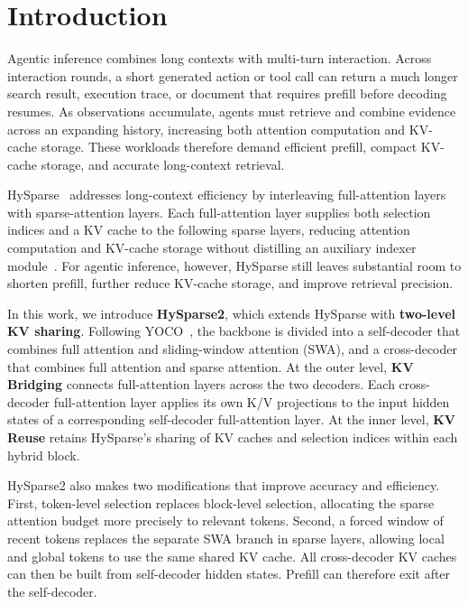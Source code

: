 \section{Introduction}
Agentic inference combines long contexts with multi-turn interaction.
Across interaction rounds, a short generated action or tool call can return a much longer search result, execution trace, or document that requires prefill before decoding resumes.
As observations accumulate, agents must retrieve and combine evidence across an expanding history, increasing both attention computation and KV-cache storage.
These workloads therefore demand efficient prefill, compact KV-cache storage, and accurate long-context retrieval.

HySparse~\citep{hysparse} addresses long-context efficiency by interleaving full-attention layers with sparse-attention layers.
Each full-attention layer supplies both selection indices and a KV cache to the following sparse layers, reducing attention computation and KV-cache storage without distilling an auxiliary indexer module~\citetext{\citealp{seerattn_v1}; \citealp{dsa}}.
For agentic inference, however, HySparse still leaves substantial room to shorten prefill, further reduce KV-cache storage, and improve retrieval precision.

In this work, we introduce \textbf{HySparse2}, which extends HySparse with \textbf{two-level KV sharing}.
Following YOCO~\citep{yoco}, the backbone is divided into a self-decoder that combines full attention and sliding-window attention (SWA), and a cross-decoder that combines full attention and sparse attention.
At the outer level, \textbf{KV Bridging} connects full-attention layers across the two decoders.
Each cross-decoder full-attention layer applies its own K/V projections to the input hidden states of a corresponding self-decoder full-attention layer.
At the inner level, \textbf{KV Reuse} retains HySparse's sharing of KV caches and selection indices within each hybrid block.

HySparse2 also makes two modifications that improve accuracy and efficiency.
First, token-level selection replaces block-level selection, allocating the sparse attention budget more precisely to relevant tokens.
Second, a forced window of recent tokens replaces the separate SWA branch in sparse layers, allowing local and global tokens to use the same shared KV cache.
All cross-decoder KV caches can then be built from self-decoder hidden states.
Prefill can therefore exit after the self-decoder.

